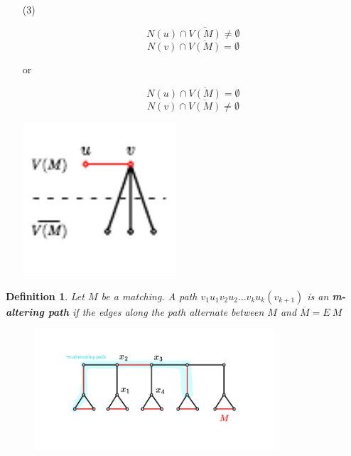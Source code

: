 \documentclass[notitlepage, 12pt]{article}
\newtheorem*{definition}{Definition}
\begin{document}
\begin{itemize}
\item[(3)]
\begin{minipage}{.20\textwidth}
  \[
    N(u) \cap \overline{V(M)} \neq \emptyset
  \]
  \[
    N(v) \cap \overline{V(M)} = \emptyset
  \]
\end{minipage}%
\begin{minipage}{.05\textwidth}
  or
  \centering
\end{minipage}%
\begin{minipage}{.20\textwidth}
  \[
    N(u) \cap \overline{V(M)} = \emptyset
  \]
  \[
    N(v) \cap \overline{V(M)} \neq \emptyset
  \]
\end{minipage}%
\begin{minipage}{.6\textwidth}
  \includegraphics[width=0.45\textwidth]{max-matching-structure-3.pdf}
  \centering
\end{minipage}
\end{itemize}
\begin{definition}
Let $M$ be a matching. A path $v_1u_1v_2u_2\dots v_k u_k (v_{k+1})$ is an \textbf{m-altering path} if the edges along
the path alternate between $M$ and $\overline{M} = E \ M$
\end{definition}
\begin{figure}[h]
  \includegraphics[width=0.8\textwidth]{m-alternating-example.pdf}
  \centering
\end{figure}
\end{document}
